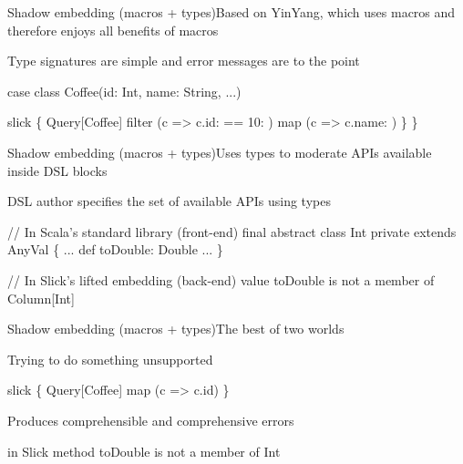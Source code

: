 \documentclass{beamer}
\begin{document}
\begin{frame}[fragile]{Shadow embedding (macros + types)}{Based on YinYang, which uses macros and therefore enjoys all benefits of macros}
  \vspace{1em}
  \begin{exampleblock}{Type signatures are simple and error messages are to the point}
    \begin{semiverbatim}
case class Coffee(id: Int, name: String, ...)

slick \{
  Query[Coffee] filter
    (c => c.id: \text{\color{blue}{Int}} == 10: \text{\color{blue}{Int}}) map
    (c => c.name: \text{\color{blue}{String}})
  \}
\}
    \end{semiverbatim}
  \end{exampleblock}
\end{frame}

\begin{frame}[fragile]{Shadow embedding (macros + types)}{Uses types to moderate APIs available inside DSL blocks}
  \vspace{1em}
  \begin{exampleblock}{DSL author specifies the set of available APIs using types}
    \begin{semiverbatim}
// In Scala's standard library (front-end)
final abstract class Int private extends AnyVal \{
  ...
  def toDouble: Double
  ...
\}

// In Slick's lifted embedding (back-end)
value toDouble is not a member of Column[Int]
    \end{semiverbatim}
  \end{exampleblock}
\end{frame}

\begin{frame}[fragile]{Shadow embedding (macros + types)}{The best of two worlds}
  \vspace{1em}
  \begin{exampleblock}{Trying to do something unsupported}
    \begin{semiverbatim}
slick \{
  Query[Coffee] map
    (c => c.id\text{\color{blue}{.toDouble}})
\}
    \end{semiverbatim}
  \end{exampleblock}

  \vspace{1em}
  \begin{exampleblock}{Produces comprehensible and comprehensive errors}
    \begin{semiverbatim}
in Slick method toDouble is not a member of Int
    \end{semiverbatim}
  \end{exampleblock}
\end{frame}
\end{document}

